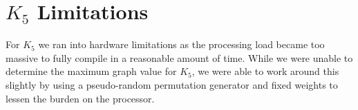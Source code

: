 \documentclass[12pt,letterpaper]{article}
\begin{document}
\section{$K_{5}$ Limitations}

For $K_{5}$ we ran into hardware limitations as the processing load became too massive to fully compile in a reasonable amount of time. While we were unable to determine the maximum graph value for $K_{5}$, we were able to work around this slightly by using a pseudo-random permutation generator and fixed weights to lessen the burden on the processor.

	\newpage \listoffigures 
\end{document}

